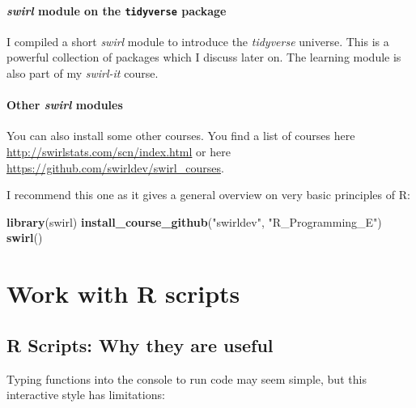 \documentclass[
  12pt,
  oneside]{book}
\newenvironment{Shaded}{\begin{snugshade}}{\end{snugshade}}
\newcommand{\FunctionTok}[1]{\textcolor[rgb]{0.13,0.29,0.53}{\textbf{#1}}}
\newcommand{\NormalTok}[1]{#1}
\newcommand{\StringTok}[1]{\textcolor[rgb]{0.31,0.60,0.02}{#1}}
\theoremstyle{definition}
\theoremstyle{definition}
\theoremstyle{definition}
\theoremstyle{definition}
\theoremstyle{remark}
\begin{document}
\hypertarget{swirl-module-on-the-tidyverse-package}{%
\subsubsection*{\texorpdfstring{\emph{swirl} module on the \texttt{tidyverse} package}{swirl module on the tidyverse package}}\label{swirl-module-on-the-tidyverse-package}}

I compiled a short \emph{swirl} module to introduce the \emph{tidyverse} universe. This is a powerful collection of packages which I discuss later on. The learning module is also part of my \emph{swirl-it} course.

\hypertarget{other-swirl-modules}{%
\subsubsection*{\texorpdfstring{Other \emph{swirl} modules}{Other swirl modules}}\label{other-swirl-modules}}

You can also install some other courses. You find a list of courses here \url{http://swirlstats.com/scn/index.html} or here \url{https://github.com/swirldev/swirl_courses}.

I recommend this one as it gives a general overview on very basic principles of R:

\begin{Shaded}
\begin{Highlighting}[]
\FunctionTok{library}\NormalTok{(swirl)}
\FunctionTok{install\_course\_github}\NormalTok{(}\StringTok{"swirldev"}\NormalTok{, }\StringTok{"R\_Programming\_E"}\NormalTok{)}
\FunctionTok{swirl}\NormalTok{()}
\end{Highlighting}
\end{Shaded}

\hypertarget{work-with-r-scripts}{%
\chapter{Work with R scripts}\label{work-with-r-scripts}}

\hypertarget{r-scripts-why-they-are-useful}{%
\section{R Scripts: Why they are useful}\label{r-scripts-why-they-are-useful}}

Typing functions into the console to run code may seem simple, but this interactive style has limitations:
\end{document}
